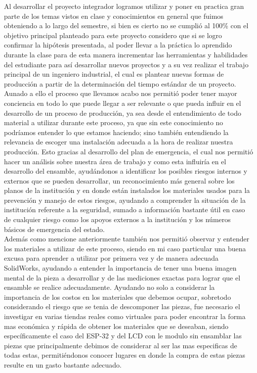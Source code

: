 Al desarrollar el proyecto integrador logramos utilizar y poner en practica gran parte de los temas vistos en clase y conocimientos en general que fuimos obteniendo a lo largo del semestre, si bien es cierto no se cumplió al 100\%  con el objetivo principal planteado para este proyecto considero que si se logro confirmar la hipótesis presentada, al poder llevar a la práctica lo aprendido durante la clase para de esta manera incrementar las herramientas y habilidades del estudiante para así desarrollar nuevos proyectos y a su vez realizar el trabajo principal de un ingeniero industrial, el cual es plantear nuevas formas de producción a partir de la determinación del tiempo estándar de un proyecto.
\\Aunado a ello el proceso que llevamos acabo nos permitió poder tener mayor conciencia en todo lo que puede llegar a ser relevante o que pueda influir en el desarrollo de un proceso de producción, ya sea desde el entendimiento  de todo material a utilizar durante este proceso, ya que sin este conocimiento no podríamos entender lo que estamos haciendo; sino también entendiendo la relevancia de escoger una instalación adecuada a la hora de realizar nuestra producción. Esto gracias al desarrollo del plan de emergencia, el cual nos permitió hacer un análisis sobre nuestra área de trabajo y como esta influiría en el desarrollo del ensamble, ayudándonos a identificar los posibles riesgos internos y externos que se pueden desarrollar, un reconocimiento más general sobre los planos de la institución y en donde están instalados los materiales usados para la prevención y manejo de estos riesgos, ayudando a comprender la situación de la institución referente a la seguridad, sumado a información bastante útil en caso de cualquier riesgo como los apoyos externos a la institución y los números básicos de emergencia del estado.
\\Además como mencione anteriormente también nos permitió observar y entender los materiales a utilizar de este proceso, siendo en mi caso particular una buena excusa para aprender a utilizar por primera vez y de manera adecuada SolidWorks, ayudando a entender la importancia de tener una buena imagen mental de la pieza a desarrollar y de las mediciones exactas para lograr que el ensamble se realice adecuadamente. Ayudando no solo a considerar la importancia de los costos en los materiales que debemos ocupar, sobretodo considerando el riesgo que se tenia de descomponer las piezas, fue necesario el investigar en varias tiendas reales como virtuales para poder encontrar la forma mas económica y rápida de obtener los materiales que se deseaban, siendo específicamente el caso del ESP-32 y del LCD con le modulo sin ensamblar las piezas que principalmente debimos de considerar al ser las mas especificas de todas estas, permitiéndonos conocer lugares en donde la compra de estas piezas resulte en un gasto bastante adecuado.
